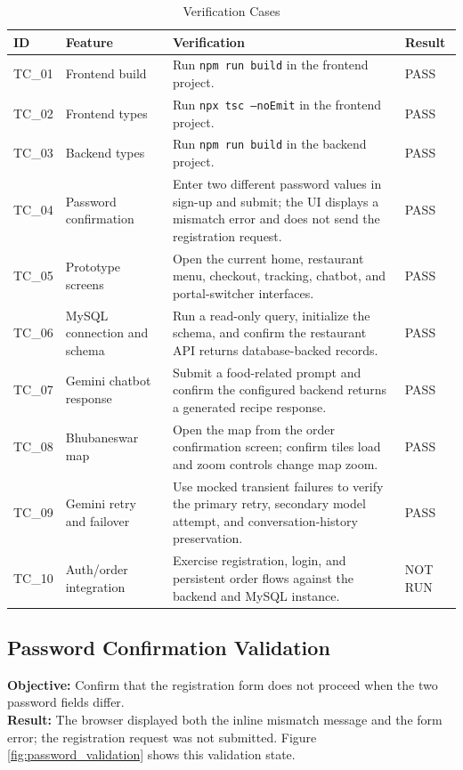 \begin{table}[H]
\centering
\caption{Verification Cases}
\label{tab:test_cases}
\renewcommand{\arraystretch}{1.35}
\begin{tabular}{|l|p{3.4cm}|p{6.5cm}|l|}
\hline
\textbf{ID} & \textbf{Feature} & \textbf{Verification} & \textbf{Result} \\
\hline
TC\_01 & Frontend build & Run \texttt{npm run build} in the frontend project. & PASS \\
\hline
TC\_02 & Frontend types & Run \texttt{npx tsc --noEmit} in the frontend project. & PASS \\
\hline
TC\_03 & Backend types & Run \texttt{npm run build} in the backend project. & PASS \\
\hline
TC\_04 & Password confirmation & Enter two different password values in sign-up and submit; the UI displays a mismatch error and does not send the registration request. & PASS \\
\hline
TC\_05 & Prototype screens & Open the current home, restaurant menu, checkout, tracking, chatbot, and portal-switcher interfaces. & PASS \\
\hline
TC\_06 & MySQL connection and schema & Run a read-only query, initialize the schema, and confirm the restaurant API returns database-backed records. & PASS \\
\hline
TC\_07 & Gemini chatbot response & Submit a food-related prompt and confirm the configured backend returns a generated recipe response. & PASS \\
\hline
TC\_08 & Bhubaneswar map & Open the map from the order confirmation screen; confirm tiles load and zoom controls change map zoom. & PASS \\
\hline
TC\_09 & Gemini retry and failover & Use mocked transient failures to verify the primary retry, secondary model attempt, and conversation-history preservation. & PASS \\
\hline
TC\_10 & Auth/order integration & Exercise registration, login, and persistent order flows against the backend and MySQL instance. & NOT RUN \\
\hline
\end{tabular}
\end{table}
\newpage
\subsection{Password Confirmation Validation}
\textbf{Objective:} Confirm that the registration form does not proceed when the two password fields differ. \\
\textbf{Result:} The browser displayed both the inline mismatch message and the form error; the registration request was not submitted. Figure \ref{fig:password_validation} shows this validation state.


